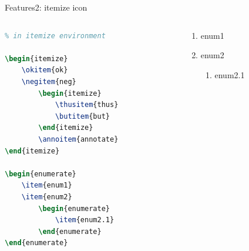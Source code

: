 \documentclass[aspectratio=1610,14pt]{beamer}
\begin{document}
\begin{frame}[fragile]{Features2: itemize icon}
    \begin{columns}
        \begin{column}{0.5\textwidth}
            \begin{lstlisting}[language=TeX]
% using feature command 
% in itemize environment

\begin{itemize}
    \okitem{ok}
    \negitem{neg}
        \begin{itemize}
            \thusitem{thus}
            \butitem{but}
        \end{itemize}
        \annoitem{annotate}
\end{itemize}

\begin{enumerate}
    \item{enum1}
    \item{enum2}
        \begin{enumerate}
            \item{enum2.1}
        \end{enumerate}
\end{enumerate}            
            \end{lstlisting}
        \end{column}
        \begin{column}{0.5\textwidth}
            \begin{itemize}
                    \begin{itemize}
                    \end{itemize}
            \end{itemize}

            \begin{enumerate}
                \item{enum1}
                \item{enum2}
                    \begin{enumerate}
                        \item{enum2.1}
                    \end{enumerate}
            \end{enumerate}
        \end{column}
    \end{columns}
\end{frame}
\end{document}
